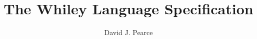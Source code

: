 \documentclass[10pt]{book}
\title{\Huge {\bf The Whiley Language Specification}}
\author{David J. Pearce}
\begin{document}

\tableofcontents









%

%
%
%

\printglossaries



\end{document}
